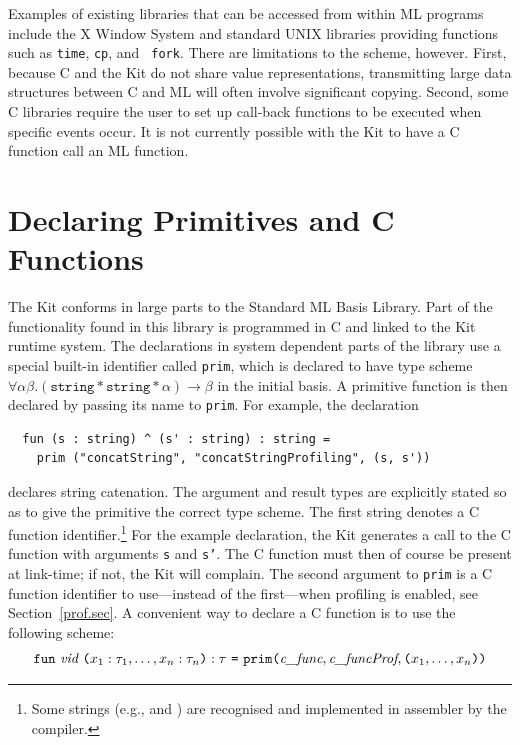 \documentclass[12pt]{book}
\begin{document}
Examples of existing libraries that can be accessed from within ML
programs include the X Window System and standard UNIX libraries
providing functions such as {\tt time}, {\tt cp}, and {\tt
fork}. There are limitations to the scheme, however. First, because C
and the Kit do not share value representations, transmitting large
data structures between C and ML will often involve significant
copying. Second, some C libraries require the user to set up
%
call-back functions to be executed when specific events occur. It is
not currently possible with the Kit to have a C function call an ML
function.

\section{Declaring Primitives and C Functions}
\label{parPassing.sec}
The Kit conforms in large parts to the Standard ML Basis Library. Part
of the functionality found in this library is programmed in C and
linked to the Kit runtime system.  The declarations in system
dependent parts of the library use a special built-in identifier
called \texttt{prim}, which is declared to have type
scheme $\forall \alpha \beta .  (\texttt{string} \ast \texttt{string}
\ast \alpha) \rightarrow \beta$ in the initial basis.  A primitive
function is then declared by passing its name to \texttt{prim}.  For
example, the declaration
\begin{verbatim}
  fun (s : string) ^ (s' : string) : string = 
    prim ("concatString", "concatStringProfiling", (s, s'))
\end{verbatim}
declares string catenation.  The argument and result types are
explicitly stated so as to give the primitive the correct type scheme.
The first string  denotes a C
function identifier.\footnote{Some strings (e.g.,  and ) are
  recognised and implemented in assembler by the compiler.} For the
example declaration, the Kit generates a call to the C function  with arguments {\tt s} and {\tt s'}. The C
function must then of course be present at link-time; if not, the Kit will complain. The second
argument to {\tt prim} is a C function identifier to use---instead of the first---when profiling is
enabled, see Section~\ref{prof.sec}. A convenient way to declare a C function is to use the
following scheme:
$$\texttt{fun}~ \emph{vid} ~\texttt{(}x_1:\tau_1, \ldots, x_n:\tau_n\texttt{)}
    : \tau ~\texttt{=} ~\texttt{prim(}\emph{c\_func}, \emph{c\_funcProf}, \texttt{(}
  x_1, \ldots, x_n\texttt{)} \texttt{)}
$$
\end{document}
